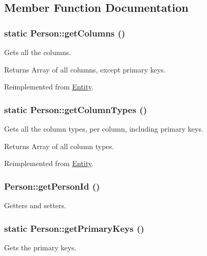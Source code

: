 \subsection{Member Function Documentation}
\hypertarget{classPerson_aeab90b54dcfecd955b00bd64ceec6eae}{
\subsubsection[{getColumns}]{\setlength{\rightskip}{0pt plus 5cm}static Person::getColumns ()}}
\label{classPerson_aeab90b54dcfecd955b00bd64ceec6eae}
Gets all the columns.

\begin{DoxyReturn}{Returns}
Array of all columns, except primary keys. 
\end{DoxyReturn}


Reimplemented from \hyperlink{classEntity_a394717a08ffd54ec9a14d06727c86719}{Entity}.

\hypertarget{classPerson_aed60680c05bbf313249396521da7df27}{
\subsubsection[{getColumnTypes}]{\setlength{\rightskip}{0pt plus 5cm}static Person::getColumnTypes ()}}
\label{classPerson_aed60680c05bbf313249396521da7df27}
Gets all the column types, per column, including primary keys.

\begin{DoxyReturn}{Returns}
Array of all column types. 
\end{DoxyReturn}


Reimplemented from \hyperlink{classEntity_ad69437219c10955803707fbf6ac458e7}{Entity}.

\hypertarget{classPerson_afadb1ac8614a060035c9992d2663e27e}{
\subsubsection[{getPersonId}]{\setlength{\rightskip}{0pt plus 5cm}Person::getPersonId ()}}
\label{classPerson_afadb1ac8614a060035c9992d2663e27e}
Getters and setters. \hypertarget{classPerson_a127a92657a50a2a51c8892dd625af9ee}{
\subsubsection[{getPrimaryKeys}]{\setlength{\rightskip}{0pt plus 5cm}static Person::getPrimaryKeys ()}}
\label{classPerson_a127a92657a50a2a51c8892dd625af9ee}
Gets the primary keys.

